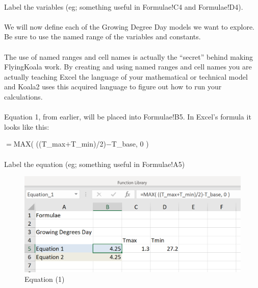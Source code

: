 \documentclass[12pt,a4paper,twoside,openright,titlepage]{article}
\begin{document}
\paragraph{} Label the variables (eg; something useful in Formulae!C4 and Formulae!D4).

\paragraph{} We will now define each of the Growing Degree Day models we want to explore. Be sure to use the named range of the variables and constants.

\paragraph{} The use of named ranges and cell names is actually the ``secret'' behind making FlyingKoala work. By creating and using named ranges and cell names you are actually teaching Excel the language of your mathematical or technical model and Koala2 uses this acquired language to figure out how to run your calculations.

\paragraph{} Equation 1, from earlier, will be placed into Formulae!B5. In Excel's formula it looks like this:

$=$MAX( ((T\_max$+$T\_min)/2)$-$T\_base, 0 )

\paragraph{} Label the equation (eg; something useful in Formulae!A5)

\begin{figure}[h!]
	\centering
	\includegraphics[scale=0.9]{images/equation_1.PNG}
	\caption{Equation (1)}
\end{figure}
\end{document}
